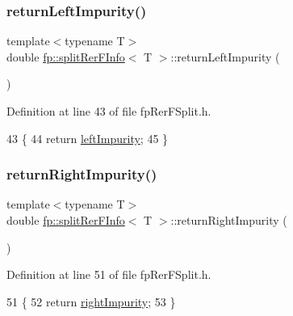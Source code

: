\subsubsection{\texorpdfstring{return\+Left\+Impurity()}{returnLeftImpurity()}}
{\footnotesize\ttfamily template$<$typename T$>$ \\
double \hyperlink{classfp_1_1splitRerFInfo}{fp\+::split\+Rer\+F\+Info}$<$ T $>$\+::return\+Left\+Impurity (\begin{DoxyParamCaption}{ }\end{DoxyParamCaption})\hspace{0.3cm}{\ttfamily [inline]}}



Definition at line 43 of file fp\+Rer\+F\+Split.\+h.


\begin{DoxyCode}
43                                                   \{
44                     \textcolor{keywordflow}{return} \hyperlink{classfp_1_1splitRerFInfo_a22a358c2d6a8105bf1af86ed2823d1d1}{leftImpurity};
45                 \}
\end{DoxyCode}
\mbox{\label{classfp_1_1splitRerFInfo_a436810df96a0cdec2c8aab72609a1210}} 
\subsubsection{\texorpdfstring{return\+Right\+Impurity()}{returnRightImpurity()}}
{\footnotesize\ttfamily template$<$typename T$>$ \\
double \hyperlink{classfp_1_1splitRerFInfo}{fp\+::split\+Rer\+F\+Info}$<$ T $>$\+::return\+Right\+Impurity (\begin{DoxyParamCaption}{ }\end{DoxyParamCaption})\hspace{0.3cm}{\ttfamily [inline]}}



Definition at line 51 of file fp\+Rer\+F\+Split.\+h.


\begin{DoxyCode}
51                                                    \{
52                     \textcolor{keywordflow}{return} \hyperlink{classfp_1_1splitRerFInfo_ae9c05e45d6da53a663393e4ff2a01c41}{rightImpurity};
53                 \}
\end{DoxyCode}
\mbox{\label{classfp_1_1splitRerFInfo_a99b2dfae4d0e606be9511bd6c61b53dc}} 
